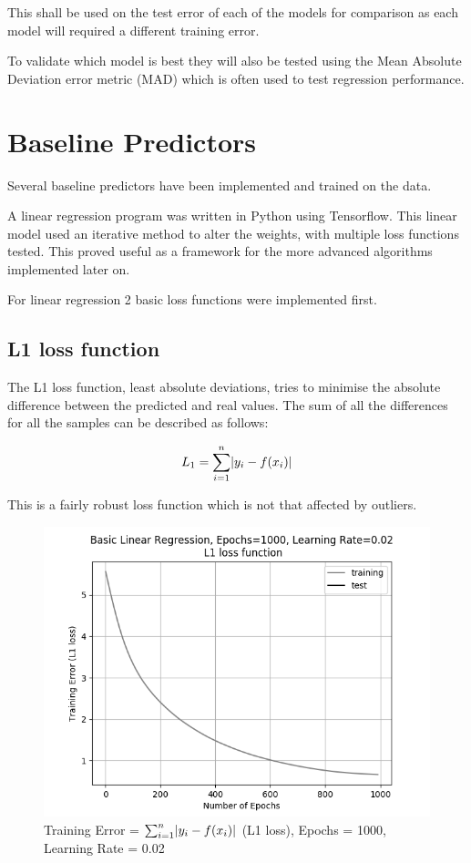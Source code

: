 \documentclass[10pt,twocolumn,letterpaper]{article}
\DeclarePairedDelimiter\abs{\lvert}{\rvert}%
\begin{document}
This shall be used on the test error of each of the models for comparison as each model will required a different training error.

To validate which model is best they will also be tested using the Mean Absolute Deviation error metric (MAD) which is often used to test regression performance.

\section{Baseline Predictors}
Several baseline predictors have been implemented and trained on the data. 

A linear regression program was written in Python using Tensorflow. This linear model used an iterative method to alter the weights, with multiple loss functions tested. This proved useful as a framework for the more advanced algorithms implemented later on.

For linear regression 2 basic loss functions were implemented first.

\subsection{L1 loss function}
The L1 loss function, least absolute deviations, tries to minimise the absolute difference between the predicted and real values. The sum of all the differences for all the samples can be described as follows:

\begin{equation}
L_1 = \sum_{i = 1}^{n} \abs{y_i - f(x_i)}
\end{equation}

This is a fairly robust loss function which is not that affected by outliers.

\begin{figure}[h]
	\begin{center}
		\includegraphics[width=0.9\linewidth]{img/l1loss.png}
	\end{center}
	\caption{Training Error = $\sum_{i = 1}^{n} \abs{y_i - f(x_i)}$ (L1 loss), Epochs = 1000, Learning Rate = 0.02}
	\label{fig:l1loss}
\end{figure}
\end{document}
